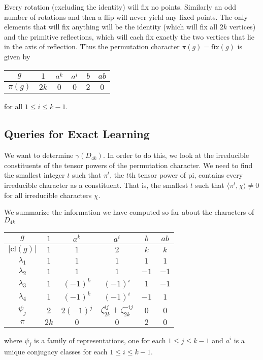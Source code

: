 Every rotation (excluding the identity) will fix no points. Similarly an odd number of rotations and then a flip 
will never yield any fixed points.  The only elements that will fix anything will be the identity (which will fix 
all $2k$ vertices) and the primitive reflections, which will each fix exactly the two vertices that lie in the axis 
of reflection. Thus the permutation character $\pi(g) = \text{fix}(g)$ is given by
\begin{center}
\begin{tabular}{c|ccccc}
    $g$ &$1$ & $a^k$ & $a^i$ & $b$ & $ab$ \\ \hline
    $\pi(g)$ & $2k$ & $0$ & $0$ & $2$ & $0$ \\
\end{tabular}
\end{center}
for all $1 \leq i \leq k-1$.

\subsection{Queries for Exact Learning}

We want to determine $\gamma(D_{4k})$. In order to do this, we look at the irreducible constituents of the tensor 
powers of the permutation character. We need to find the smallest integer $t$ such that $\pi^t$, the $t$th tensor 
power of pi, contains every irreducible character as a constituent. That is, the smallest $t$ such that $\langle 
\pi^t, \chi \rangle \neq 0$ for all irreducible characters $\chi$.


We summarize the information we have computed so far about the characters of $D_{4k}$

\def\cl{\text{cl}}
\begin{center}
\begin{tabular}{c|ccccc}
    $g$ &$1$ & $a^k$ & $a^i$ & $b$ & $ab$ \\ \hline
    $|\cl(g)|$ & $1$ & $1$ & $2$ & $k$ & $k$ \\ \hline
%
    $\lambda_1$ & $1$ & $1$ & $1$ & $1$ & $1$ \\
    $\lambda_2$ & $1$ & $1$ & $1$ & $-1$ & $-1$ \\
    $\lambda_3$ & $1$ & $(-1)^k$ & $(-1)^i$ & $1$ & $-1$ \\
    $\lambda_4$ & $1$ & $(-1)^k$ & $(-1)^i$ & $-1$ & $1$ \\
    $\psi_j$ & $2$ & $2(-1)^j$ & $\zeta_{2k}^{ij} + \zeta_{2k}^{-ij}$ & $0$ & $0$ \\ \hline
    $\pi$ & $2k$ & $0$ & $0$ & $2$ & $0$ 
\end{tabular}
\end{center}
where $\psi_j$ is a family of representations, one for each $1 \leq j \leq k-1$ and $a^i$ is a unique conjugacy 
classes for each $1 \leq i \leq k-1$.

